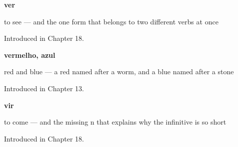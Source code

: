 \noindent\begin{minipage}[t]{\linewidth}
\raggedright
\textbf{ver}\par
\small to see — and the one form that belongs to two different verbs at once\par
\footnotesize Introduced in Chapter 18.
\end{minipage}\par\medskip

\noindent\begin{minipage}[t]{\linewidth}
\raggedright
\textbf{vermelho, azul}\par
\small red and blue — a red named after a worm, and a blue named after a stone\par
\footnotesize Introduced in Chapter 13.
\end{minipage}\par\medskip

\noindent\begin{minipage}[t]{\linewidth}
\raggedright
\textbf{vir}\par
\small to come — and the missing n that explains why the infinitive is so short\par
\footnotesize Introduced in Chapter 18.
\end{minipage}\par\medskip
